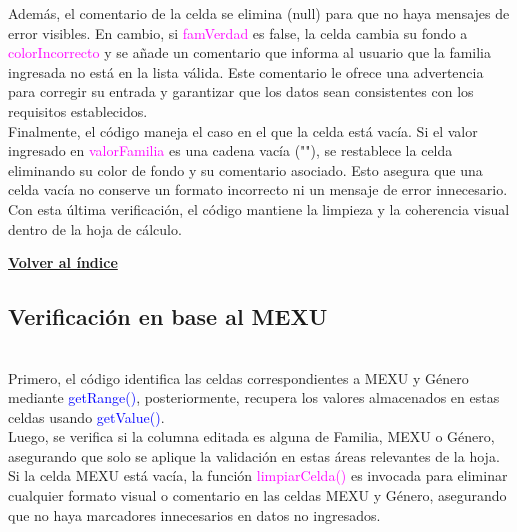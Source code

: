 \documentclass[12pt]{article} %
\begin{document}
    Además, el comentario de la celda se elimina (null) para que no haya mensajes de error visibles. En cambio, si \textcolor{magenta}{famVerdad} es false, la celda cambia su fondo a \textcolor{magenta}{colorIncorrecto} y se añade un comentario que informa al usuario que la familia ingresada no está en la lista válida. Este comentario le ofrece una advertencia para corregir su entrada y garantizar que los datos sean consistentes con los requisitos establecidos.  \\
    
    Finalmente, el código maneja el caso en el que la celda está vacía. Si el valor ingresado en \textcolor{magenta}{valorFamilia} es una cadena vacía (""), se restablece la celda eliminando su color de fondo y su comentario asociado. Esto asegura que una celda vacía no conserve un formato incorrecto ni un mensaje de error innecesario. Con esta última verificación, el código mantiene la limpieza y la coherencia visual dentro de la hoja de cálculo.
    
        


            \begin{flushright}
                \hyperlink{toc}{\textbf{Volver al índice}}
            \end{flushright}


    \subsection*{Verificación en base al MEXU}
    \\


    Primero, el código identifica las celdas correspondientes a MEXU y Género mediante \textcolor{blue}{getRange()}, posteriormente, recupera los valores almacenados en estas celdas usando \textcolor{blue}{getValue()}.  \\
    
    Luego, se verifica si la columna editada es alguna de Familia, MEXU o Género, asegurando que solo se aplique la validación en estas áreas relevantes de la hoja. Si la celda MEXU está vacía, la función \textcolor{magenta}{limpiarCelda()} es invocada para eliminar cualquier formato visual o comentario en las celdas MEXU y Género, asegurando que no haya marcadores innecesarios en datos no ingresados. 
\end{document}
